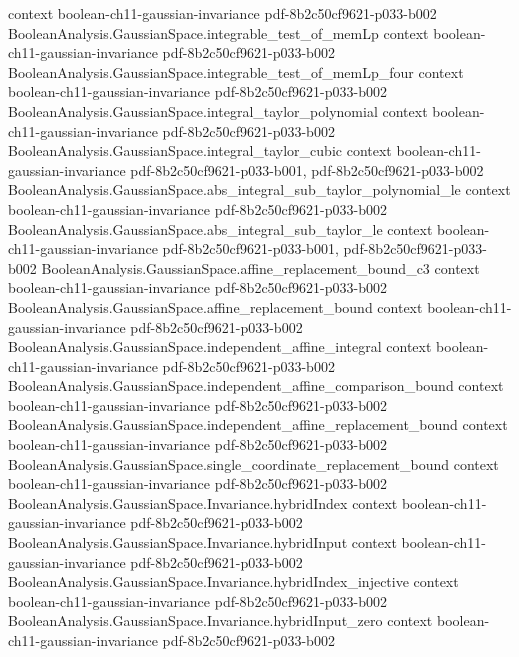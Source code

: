 \begin{theorem}
  {context}
  {boolean-ch11-gaussian-invariance}
  {pdf-8b2c50cf9621-p033-b002}
\proofstep
  {BooleanAnalysis.GaussianSpace.integrable_test_of_memLp}
  {context}
  {boolean-ch11-gaussian-invariance}
  {pdf-8b2c50cf9621-p033-b002}
\proofstep
  {BooleanAnalysis.GaussianSpace.integrable_test_of_memLp_four}
  {context}
  {boolean-ch11-gaussian-invariance}
  {pdf-8b2c50cf9621-p033-b002}
\proofstep
  {BooleanAnalysis.GaussianSpace.integral_taylor_polynomial}
  {context}
  {boolean-ch11-gaussian-invariance}
  {pdf-8b2c50cf9621-p033-b002}
\proofstep
  {BooleanAnalysis.GaussianSpace.integral_taylor_cubic}
  {context}
  {boolean-ch11-gaussian-invariance}
  {pdf-8b2c50cf9621-p033-b001,
    pdf-8b2c50cf9621-p033-b002}
\proofstep
  {BooleanAnalysis.GaussianSpace.abs_integral_sub_taylor_polynomial_le}
  {context}
  {boolean-ch11-gaussian-invariance}
  {pdf-8b2c50cf9621-p033-b002}
\proofstep
  {BooleanAnalysis.GaussianSpace.abs_integral_sub_taylor_le}
  {context}
  {boolean-ch11-gaussian-invariance}
  {pdf-8b2c50cf9621-p033-b001,
    pdf-8b2c50cf9621-p033-b002}
\proofstep
  {BooleanAnalysis.GaussianSpace.affine_replacement_bound_c3}
  {context}
  {boolean-ch11-gaussian-invariance}
  {pdf-8b2c50cf9621-p033-b002}
\proofstep
  {BooleanAnalysis.GaussianSpace.affine_replacement_bound}
  {context}
  {boolean-ch11-gaussian-invariance}
  {pdf-8b2c50cf9621-p033-b002}
\proofstep
  {BooleanAnalysis.GaussianSpace.independent_affine_integral}
  {context}
  {boolean-ch11-gaussian-invariance}
  {pdf-8b2c50cf9621-p033-b002}
\proofstep
  {BooleanAnalysis.GaussianSpace.independent_affine_comparison_bound}
  {context}
  {boolean-ch11-gaussian-invariance}
  {pdf-8b2c50cf9621-p033-b002}
\proofstep
  {BooleanAnalysis.GaussianSpace.independent_affine_replacement_bound}
  {context}
  {boolean-ch11-gaussian-invariance}
  {pdf-8b2c50cf9621-p033-b002}
\proofstep
  {BooleanAnalysis.GaussianSpace.single_coordinate_replacement_bound}
  {context}
  {boolean-ch11-gaussian-invariance}
  {pdf-8b2c50cf9621-p033-b002}
\proofstep
  {BooleanAnalysis.GaussianSpace.Invariance.hybridIndex}
  {context}
  {boolean-ch11-gaussian-invariance}
  {pdf-8b2c50cf9621-p033-b002}
\proofstep
  {BooleanAnalysis.GaussianSpace.Invariance.hybridInput}
  {context}
  {boolean-ch11-gaussian-invariance}
  {pdf-8b2c50cf9621-p033-b002}
\proofstep
  {BooleanAnalysis.GaussianSpace.Invariance.hybridIndex_injective}
  {context}
  {boolean-ch11-gaussian-invariance}
  {pdf-8b2c50cf9621-p033-b002}
\proofstep
  {BooleanAnalysis.GaussianSpace.Invariance.hybridInput_zero}
  {context}
  {boolean-ch11-gaussian-invariance}
  {pdf-8b2c50cf9621-p033-b002}

\end{theorem}
